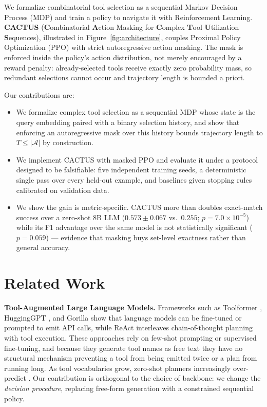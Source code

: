 \documentclass[11pt]{article}
\begin{document}
We formalize combinatorial tool selection as a sequential Markov Decision Process (MDP) and train a policy to navigate it with Reinforcement Learning. \textbf{CACTUS} (\textbf{C}ombinatorial \textbf{A}ction Masking for \textbf{C}omplex \textbf{T}ool \textbf{U}tilization \textbf{S}equences), illustrated in Figure~\ref{fig:architecture}, couples Proximal Policy Optimization (PPO) \cite{schulman2017ppo} with strict autoregressive action masking. The mask is enforced inside the policy's action distribution, not merely encouraged by a reward penalty: already-selected tools receive exactly zero probability mass, so redundant selections cannot occur and trajectory length is bounded a priori.

Our contributions are:
\begin{itemize}
    \item We formalize complex tool selection as a sequential MDP whose state is the query embedding paired with a binary selection history, and show that enforcing an autoregressive mask over this history bounds trajectory length to $T \le |\mathcal{A}|$ by construction.
    \item We implement CACTUS with masked PPO and evaluate it under a protocol designed to be falsifiable: five independent training seeds, a deterministic single pass over every held-out example, and baselines given stopping rules calibrated on validation data.
    \item We show the gain is metric-specific. CACTUS more than doubles exact-match success over a zero-shot 8B LLM ($0.573 \pm 0.067$ vs.\ $0.255$; $p = 7.0\times10^{-5}$) while its F1 advantage over the same model is not statistically significant ($p = 0.059$) --- evidence that masking buys set-level exactness rather than general accuracy.
\end{itemize}

\section{Related Work}
\textbf{Tool-Augmented Large Language Models.} Frameworks such as Toolformer \cite{schick2023toolformer}, HuggingGPT \cite{shen2023hugginggpt}, and Gorilla \cite{patil2023gorilla} show that language models can be fine-tuned or prompted to emit API calls, while ReAct \cite{yao2022react} interleaves chain-of-thought planning with tool execution. These approaches rely on few-shot prompting or supervised fine-tuning, and because they generate tool names as free text they have no structural mechanism preventing a tool from being emitted twice or a plan from running long. As tool vocabularies grow, zero-shot planners increasingly over-predict \cite{qin2023toolllm}. Our contribution is orthogonal to the choice of backbone: we change the \emph{decision procedure}, replacing free-form generation with a constrained sequential policy.
\end{document}
